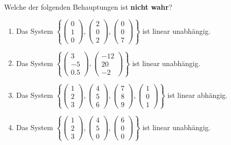 \subsection*{}
Welche der folgenden Behauptungen ist \textbf{nicht wahr}?
\renewcommand{\labelenumi}{(\alph{enumi})}
\begin{enumerate}
	\item 
	Das System $ \left\lbrace 
	\begin{pmatrix}
	0 \\ 1 \\ 0
	\end{pmatrix},
	\begin{pmatrix}
	2 \\ 0 \\ 2
	\end{pmatrix},
	\begin{pmatrix}
	0 \\ 0 \\ 7
	\end{pmatrix}
	\right\rbrace $
	ist linear unabhängig.
	\item
	Das System $ \left\lbrace 
	\begin{pmatrix}
	3 \\ -5 \\ 0.5
	\end{pmatrix},
	\begin{pmatrix}
	-12 \\ 20 \\ -2
	\end{pmatrix}
	\right\rbrace $
	ist linear unabhängig.
	
	\item
	Das System $ \left\lbrace 
	\begin{pmatrix}
	1 \\ 2 \\ 3
	\end{pmatrix},
	\begin{pmatrix}
	4 \\ 5 \\ 6
	\end{pmatrix},
	\begin{pmatrix}
	7 \\ 8 \\ 9
	\end{pmatrix},
	\begin{pmatrix}
	1 \\ 0 \\ 1
	\end{pmatrix}
	\right\rbrace $
	ist linear abhängig.
	\item
	Das System $ \left\lbrace 
	\begin{pmatrix}
	1 \\ 2 \\ 3
	\end{pmatrix},
	\begin{pmatrix}
	4 \\ 5 \\ 0
	\end{pmatrix},
	\begin{pmatrix}
	6 \\ 0 \\ 0
	\end{pmatrix}
	\right\rbrace $
	ist linear unabhängig.	
\end{enumerate}
